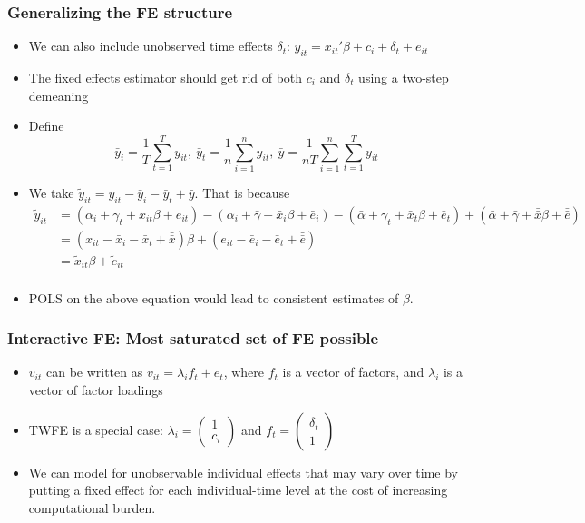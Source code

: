 \documentclass[aspectratio=169]{beamer}
\begin{document}
\begin{frame}
\frametitle{Generalizing the FE structure}
\begin{itemize}
\item We can also include unobserved time effects $\delta_t$: $y_{it} = x_{it}'\beta+ c_i + \delta_t + e_{it}$
\item  The fixed effects estimator should get rid of both $c_i$ and $\delta_t$ using a two-step demeaning
\item Define 
\[
\bar{y}_i = \frac{1}{T}\sum_{t=1}^T y_{it},\ \bar{y}_t = \frac{1}{n}\sum_{i=1}^n y_{it}, \ \bar{y}=\frac{1}{nT}\sum_{i=1}^n \sum_{t=1}^T y_{it}
\]
\item We take  $\tilde{y}_{it}=y_{it}-\bar{y}_i - \bar{y}_t + \bar{y}$. That is because
\[
\begin{aligned}
\tilde{y}_{it}&=(\alpha_i+\gamma_t+x_{it}\beta+e_{it})-(\alpha_i+\bar{\gamma}+\bar{x}_i\beta+\bar{e}_i)-(\bar{\alpha}+\gamma_t+\bar{x}_t\beta+\bar{e}_t)+(\bar{\alpha}+\bar{\gamma}+\bar{\bar{x}}\beta+\bar{\bar{e}})\\
&=(x_{it}-\bar{x}_i-\bar{x}_t+\bar{\bar{x}})\beta+(e_{it}-\bar{e}_i-\bar{e}_t+\bar{\bar{e}})\\
&=\tilde{x}_{it}\beta+\tilde{e}_{it}\\
\end{aligned}
\]
\item POLS on the above equation would lead to consistent estimates of $\beta$.
 \end{itemize}
\end{frame}

\begin{frame}
\frametitle{Interactive FE: Most saturated set of FE possible}
\begin{itemize}
\item $v_{it}$ can be written as $v_{it} = \lambda_i f_t  + e_t$, where $f_t$ is a vector of factors, and $\lambda_i$ is a vector of factor loadings
\item TWFE is a special case: $\lambda_ i = \begin{pmatrix} 1 \\ c_i \end{pmatrix}$ and $f_t = \begin{pmatrix} \delta_t \\ 1 \end{pmatrix}$
\item We can model for unobservable individual effects that may vary over time by putting a fixed effect for each individual-time level at the cost of increasing computational burden. 
 \end{itemize}
\end{frame}
\end{document}

